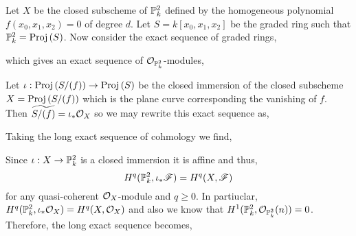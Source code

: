 \documentclass[12pt]{article}
\begin{document}
Let $X$ be the closed subscheme of $\P^2_k$ defined by the homogeneous polynomial $f(x_0, x_1, x_2) = 0$ of degree $d$. Let $S = k[x_0, x_1, x_2]$ be the graded ring such that $\P^2_k = \Proj{S}$. Now consider the exact sequence of graded rings,
\begin{center}
\end{center}
which gives an exact sequence of $\struct{\P^2_k}$-modules,
\begin{center}
\end{center}
Let $\iota : \Proj{S/(f)} \to \Proj{S}$ be the closed immersion of the closed subscheme $X = \Proj{S/(f)}$ which is the plane curve corresponding the vanishing of $f$. Then $\widetilde{S / (f)} = \iota_* \struct{X}$ so we may rewrite this exact sequence as,
\begin{center}
\end{center}
Taking the long exact sequence of cohmology we find,
\begin{center}
\end{center}
Since $\iota : X \to \P^2_k$ is a closed immersion it is affine and thus,
\[ H^q(\P^2_k, \iota_* \F) = H^q(X, \F) \]
for any quasi-coherent $\struct{X}$-module and $q \ge 0$. In partiuclar, $H^q(\P^2_k, \iota_* \struct{X}) = H^q(X, \struct{X})$ and also we know that $H^1(\P^2_k, \struct{\P^2_k}(n)) = 0$. Therefore, the long exact sequence becomes,
\end{document}
